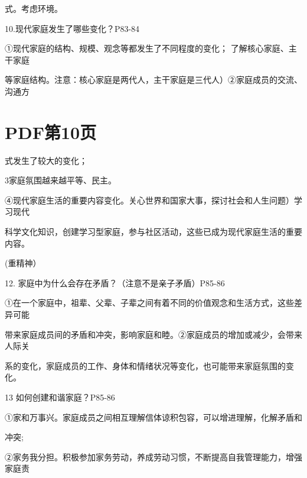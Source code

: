 \documentclass[lang=cn,11pt]{elegantbook}
\newcommand{\daofasym}[1]{{\daofasymbolfont #1}}
\newcommand{\daofasym}[1]{#1}
\begin{document}
式。考虑环境。\par

10.现代家庭发生了哪些变化？P83-84\par

\daofasym{①}现代家庭的结构、规模、观念等都发生了不同程度的变化； 了解核心家庭、主干家庭\par

等家庭结构。注意：核心家庭是两代人，主干家庭是三代人）\daofasym{②}家庭成员的交流、沟通方\par


\section*{PDF第10页}

式发生了较大的变化；\par

3家庭氛围越来越平等、民主。\par

\daofasym{④}现代家庭生活的重要内容变化。关心世界和国家大事，探讨社会和人生问题）学习现代\par

科学文化知识，创建学习型家庭，参与社区活动，这些已成为现代家庭生活的重要内容。\par

(重精神）\par

12. 家庭中为什么会存在矛盾？（注意不是亲子矛盾）P85-86\par

\daofasym{①}在一个家庭中，祖辈、父辈、子辈之间有着不同的价值观念和生活方式，这些差异可能\par

带来家庭成员间的矛盾和冲突，影响家庭和睦。\daofasym{②}家庭成员的增加或减少，会带来人际关\par

系的变化，家庭成员的工作、身体和情绪状况等变化，也可能带来家庭氛围的变化。\par

13 如何创建和谐家庭？P85-86\par

\daofasym{①}家和万事兴。家庭成员之间相互理解信体谅积包容，可以增进理解，化解矛盾和\par

冲突;\par

\daofasym{②}家务我分担。积极参加家务劳动，养成劳动习惯，不断提高自我管理能力，增强家庭责\par
\end{document}
